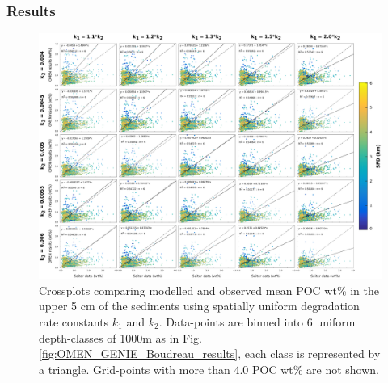 \documentclass[gmd, manuscript]{copernicus}
\begin{document}
\subsubsection{Results}\label{subsubsec:couplingresultscrossplots}
\begin{figure}[htbp]
\begin{center}
	\includegraphics[width=1.0\textwidth]{figures/OMEN-GENIE-Exp/0_2908_Invariant_k_CROSSPLOT_WITH_REGRESSION.pdf}
	\caption{Crossplots comparing modelled and observed mean POC wt\% in the upper 5 cm of the sediments using spatially uniform degradation rate constants $k_1$ and $k_2$. 
	Data-points are binned into 6 uniform depth-classes of 1000m as in Fig. \ref{fig:OMEN_GENIE_Boudreau_results}, each class is represented by a triangle. 
	Grid-points with more than 4.0 POC wt\% are not shown.}\label{fig:OMEN_GENIE_invariant_results}
\end{center}
\end{figure}
\end{document}
